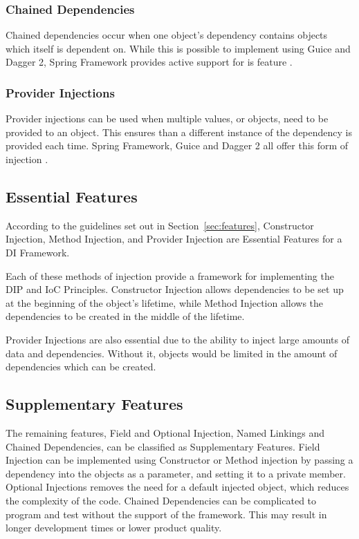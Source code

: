 \documentclass[12pt,twocolumn]{IEEEtran}
\begin{document}
\subsubsection{Chained Dependencies} %
Chained dependencies occur when one object's dependency contains objects which itself is dependent on. While this is possible to implement using Guice and Dagger 2, Spring Framework provides active support for is feature \cite{spring2019}.

\subsubsection{Provider Injections} %
Provider injections can be used when multiple values, or objects, need to be provided to an object. This ensures than a different instance of the dependency is provided each time. Spring Framework, Guice and Dagger 2 all offer this form of injection \cite{guicewiki2014,spring2019,dagger2019}. 

\subsection{Essential Features}
According to the guidelines set out in Section~\ref{sec:features}, Constructor Injection, Method Injection, and Provider Injection are Essential Features for a DI Framework.

Each of these methods of injection provide a framework for implementing the DIP and IoC Principles. Constructor Injection allows dependencies to be set up at the beginning of the object's lifetime, while Method Injection allows the dependencies to be created in the middle of the lifetime. 

Provider Injections are also essential due to the ability to inject large amounts of data and dependencies. Without it, objects would be limited in the amount of dependencies which can be created. 

\subsection{Supplementary Features}

The remaining features, Field and Optional Injection, Named Linkings and Chained Dependencies, can be classified as Supplementary Features. Field Injection can be implemented using Constructor or Method injection by passing a dependency into the objects as a parameter, and setting it to a private member. Optional Injections removes the need for a default injected object, which reduces the complexity of the code. Chained Dependencies can be complicated to program and test without the support of the framework. This may result in longer development times or lower product quality.
\end{document}

